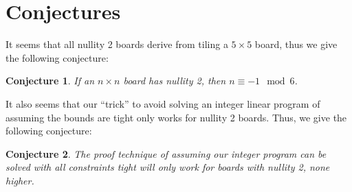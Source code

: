 \documentclass[a4paper]{article}
\newtheorem{conjecture}{Conjecture}
\begin{document}
	\section{Conjectures}
	
	It seems that all nullity 2 boards derive from tiling a $5 \times 5$ board, thus we give the following conjecture:
	\begin{conjecture}
		If an $n \times n$ board has nullity 2, then $n \equiv -1 \mod 6$.
	\end{conjecture}

	It also seems that our ``trick'' to avoid solving an integer linear program of assuming the bounds are tight only works for nullity 2 boards.
	Thus, we give the following conjecture:
	\begin{conjecture}
		The proof technique of assuming our integer program can be solved with all constraints tight will only work for boards with nullity 2, none higher.
	\end{conjecture}

	\newpage
	
	
\end{document}

